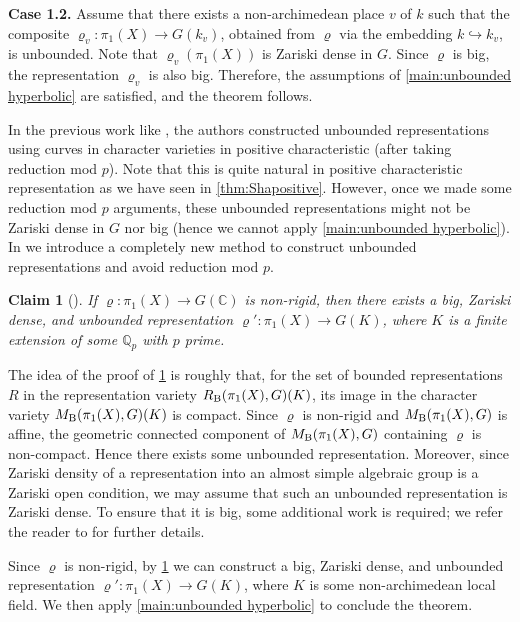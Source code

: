 \documentclass[english]{amsproc}
\theoremstyle{plain}
\newtheorem{claim}[thm]{Claim}
\theoremstyle{definition}
\theoremstyle{remark}
\theoremstyle{plain}
\numberwithin{equation}{thm} %
\newcommand{\bC}{\mathbb{C}}
\newcommand{\bQ}{\mathbb{Q}}
\begin{document}
	\medspace
	
	
	
	\noindent\textbf{Case 1.2.}
	Assume that there exists a non-archimedean place $v$ of $k$ such that the composite
	$\varrho_v \colon \pi_1(X) \to G(k_v)$, obtained from $\varrho$ via the embedding $k \hookrightarrow k_v$, is unbounded.
	Note that $\varrho_v(\pi_1(X))$ is Zariski dense in $G$.
	Since $\varrho$ is big, the representation $\varrho_v$ is also big.
	Therefore, the assumptions of \cref{main:unbounded hyperbolic} are satisfied, and the theorem follows.
	
	 In the previous work like \cite{CS08,Eys04}, the authors constructed unbounded representations using curves in character varieties in positive characteristic (after taking reduction mod $p$).  Note that this is quite natural in positive characteristic representation as we have seen in \cref{thm:Shapositive}.   However, once we made some reduction mod $p$ arguments,  these unbounded representations might not be Zariski dense in $G$ nor big (hence we cannot apply \cref{main:unbounded hyperbolic}).    In \cite{CDY22} we introduce a completely new method to construct unbounded representations and avoid reduction mod $p$. 
	\begin{claim}[{\cite[Proposition 6.1]{CDY22}}]\label{claim:unbounded}
		If $\varrho:\pi_1(X)\to G(\bC)$ is non-rigid, then there exists a  big, Zariski dense, and unbounded representation $\varrho':\pi_1(X)\to G(K)$, where $K$ is a finite extension of some $\bQ_p$ with $p$ prime.  
	\end{claim}
	The idea of the proof of \cref{claim:unbounded} is roughly that, for the set of bounded representations $R$ in the representation variety $R_{\rm B}(\pi_1(X),G)(K)$, its image in the character variety $M_{\rm B}(\pi_1(X),G)(K)$ is compact. Since $\varrho$ is non-rigid and $M_{\rm B}(\pi_1(X),G)$ is affine, the geometric connected component of  $M_{\rm B}(\pi_1(X),G)$ containing $\varrho$ is non-compact. Hence there exists some unbounded representation. Moreover, since Zariski density of a representation into an almost simple algebraic group is a Zariski open condition, we may assume that such an unbounded representation is Zariski dense.
	To ensure that it is big, some additional work is required; we refer the reader to \cite[Proposition~6.1]{CDY22} for further details.
	
	Since $\varrho$ is non-rigid, by \cref{claim:unbounded} we can construct a  big, Zariski dense, and unbounded representation $\varrho':\pi_1(X)\to G(K)$, where $K$ is some non-archimedean local field. We then apply \cref{main:unbounded hyperbolic}  to conclude the theorem.  
	
\end{document}

